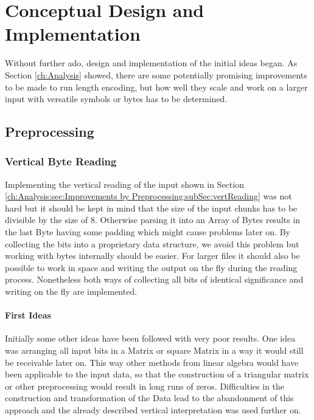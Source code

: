 
\chapter{Conceptual Design and Implementation}
\label{ch:Conceptual Design}
\par{
Without further ado, design and implementation of the initial ideas began. As Section \ref{ch:Analysis} showed, there are some potentially promising improvements to be made to run length encoding, but how well they scale and work on a larger input with versatile symbols or bytes has to be determined.
}
\section{Preprocessing}
\label{ch:Conceptual Design:sec:Preprocessing}

\subsection{Vertical Byte Reading}
\label{ch:Conceptual Design:sec:Parallel Byte Reading}
\par{
Implementing the vertical reading of the input shown in Section \ref{ch:Analysis:sec:Improvements by Preprocessing:subSec:vertReading} was not hard but it should be kept in mind that the size of the input chunks has to be divisible by the size of 8. Otherwise parsing it into an Array of Bytes results in the last Byte having some padding which might cause problems later on.  By collecting the bits into a proprietary data structure, we avoid this problem but working with bytes internally should be easier. For larger files it should also be possible to work in space and writing the output on the fly during the reading process. Nonetheless both ways of collecting all bits of identical significance and writing on the fly are implemented.}

\subsubsection{First Ideas}
\par{
Initially some other ideas have been followed with very poor results. One idea was arranging all input bits in a Matrix or square Matrix in a way it would still be receivable later on. This way other methods from linear algebra would have been applicable to the input data, so that the construction of a triangular matrix or other preprocessing would result in long runs of zeros. Difficulties in the construction and transformation of the Data lead to the abandonment of this approach and the already described vertical interpretation was used further on.}

